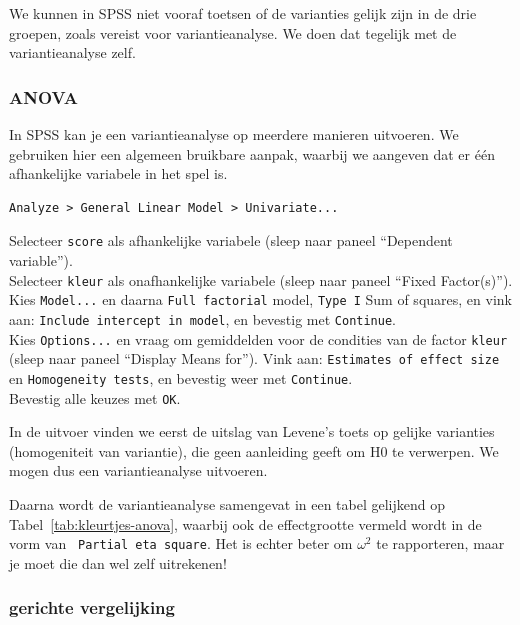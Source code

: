 \documentclass[
]{book}
\begin{document}
We kunnen in SPSS niet vooraf toetsen of de varianties gelijk zijn in de
drie groepen, zoals vereist voor variantieanalyse. We doen dat tegelijk
met de variantieanalyse zelf.

\subsubsection{ANOVA}\label{anova}

In SPSS kan je een variantieanalyse op meerdere manieren uitvoeren. We
gebruiken hier een algemeen bruikbare aanpak, waarbij we aangeven dat er
één afhankelijke variabele in het spel is.\\

\begin{verbatim}
Analyze > General Linear Model > Univariate...
\end{verbatim}

Selecteer \texttt{score} als afhankelijke variabele (sleep naar paneel
``Dependent variable'').\\
Selecteer \texttt{kleur} als onafhankelijke variabele (sleep naar paneel ``Fixed
Factor(s)'').\\
Kies \texttt{Model...} en daarna \texttt{Full\ factorial} model, \texttt{Type\ I} Sum
of squares, en vink aan: \texttt{Include\ intercept\ in\ model}, en bevestig met
\texttt{Continue}.\\
Kies \texttt{Options...} en vraag om gemiddelden voor de condities
van de factor \texttt{kleur} (sleep naar paneel ``Display Means for''). Vink aan:
\texttt{Estimates\ of\ effect\ size} en \texttt{Homogeneity\ tests}, en bevestig weer met
\texttt{Continue}.\\
Bevestig alle keuzes met \texttt{OK}.

In de uitvoer vinden we eerst de uitslag van Levene's toets op gelijke
varianties (homogeniteit van variantie), die geen aanleiding geeft om H0
te verwerpen. We mogen dus een variantieanalyse uitvoeren.

Daarna wordt de variantieanalyse samengevat in een tabel gelijkend op
Tabel~\ref{tab:kleurtjes-anova}, waarbij ook de effectgrootte vermeld
wordt in de vorm van \texttt{~Partial\ eta\ square}. Het is echter beter om
\(\omega^2\) te rapporteren, maar je moet die dan wel zelf uitrekenen!

\subsubsection{gerichte vergelijking}\label{gerichte-vergelijking}
\end{document}
